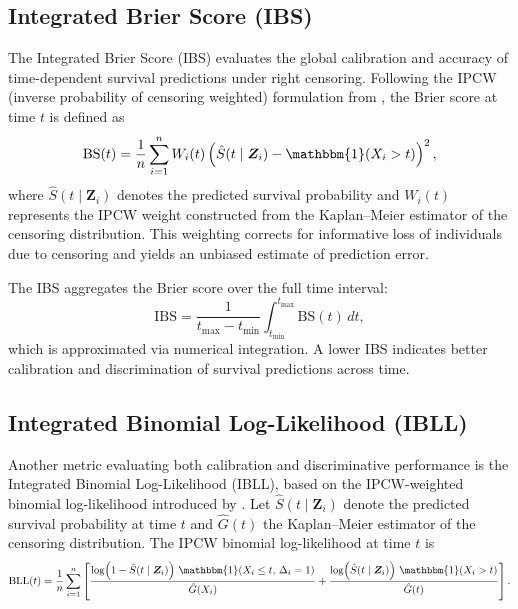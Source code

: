 \documentclass{article}
\theoremstyle{plain}
\theoremstyle{definition}
\theoremstyle{remark}
\begin{document}
\subsection{Integrated Brier Score (IBS)}
The Integrated Brier Score (IBS) evaluates the global calibration and accuracy of time-dependent survival predictions under right censoring. 
Following the IPCW (inverse probability of censoring weighted) formulation from \citet{gerds2006consistent, graf1999assessment, kvamme2019time}, 
the Brier score at time $t$ is defined as
\begin{equation}
\text{BS}(t)
= \frac{1}{n} \sum_{i=1}^n 
W_i(t)\left( \hat{S}(t \mid \bm{Z}_i) - \mathbbm{1}(X_i > t) \right)^2,
\end{equation}
where $\hat{S}(t \mid \bm{Z}_i)$ denotes the predicted survival probability and $W_i(t)$ represents the IPCW weight constructed from the Kaplan--Meier estimator of the censoring distribution.
This weighting corrects for informative loss of individuals due to censoring and yields an unbiased estimate of prediction error.

The IBS aggregates the Brier score over the full time interval:
\begin{equation}
    \mathrm{IBS} = \frac{1}{t_{\max} - t_{\min}}
    \int_{t_{\min}}^{t_{\max}} \mathrm{BS}(t)\, dt,
\end{equation}
which is approximated via numerical integration.  A lower IBS indicates better calibration and discrimination of survival predictions across time.

\subsection{Integrated Binomial Log-Likelihood (IBLL)}
Another metric evaluating both calibration and discriminative performance is the Integrated Binomial Log-Likelihood (IBLL), based on the IPCW-weighted binomial log-likelihood introduced by \citet{graf1999assessment, kvamme2019time}.  
Let $\hat{S}(t \mid \bm{Z}_i)$ denote the predicted survival probability at time $t$ and $\hat{G}(t)$ the Kaplan--Meier estimator of the censoring distribution.  
The IPCW binomial log-likelihood at time $t$ is
\begin{equation}
\label{eq:bll}
\mathrm{BLL}(t)
= \frac{1}{n} \sum_{i=1}^n 
\left[
    \frac{\log\!\left( 1 - \hat{S}(t \mid \bm{Z}_i) \right)\,
        \mathbbm{1}(X_i \le t,\, \Delta_i = 1)}{\hat{G}(X_i)}
    +
    \frac{\log\!\left( \hat{S}(t \mid \bm{Z}_i) \right)\,
        \mathbbm{1}(X_i > t)}{\hat{G}(t)}
\right].
\end{equation}
\end{document}
